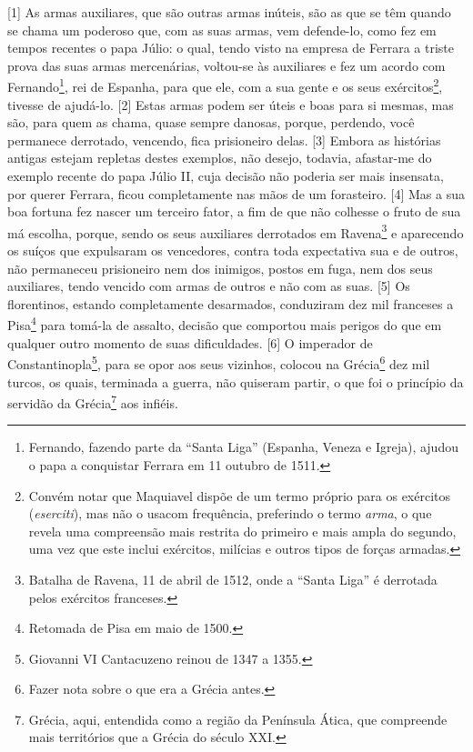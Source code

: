 {[}1{]} As armas auxiliares, que são outras armas inúteis, são as que se
têm quando se chama um poderoso que, com as suas armas, vem defende-lo,
como fez em tempos recentes o papa Júlio: o qual, tendo visto na empresa
de Ferrara a triste prova das suas armas mercenárias, voltou-se às
auxiliares e fez um acordo com Fernando\footnote{Fernando, fazendo parte
  da ``Santa Liga'' (Espanha, Veneza e Igreja), ajudou o papa a
  conquistar Ferrara em 11 outubro de 1511.}, rei de Espanha, para que
ele, com a sua gente e os seus exércitos\footnote{Convém notar que
  Maquiavel dispõe de um termo próprio para os exércitos
  (\emph{eserciti}), mas não o usacom frequência, preferindo o termo
  \emph{arma}, o que revela uma compreensão mais restrita do primeiro e
  mais ampla do segundo, uma vez que este inclui exércitos, milícias e
  outros tipos de forças armadas.}, tivesse de ajudá-lo. {[}2{]} Estas
armas podem ser úteis e boas para si mesmas, mas são, para quem as
chama, quase sempre danosas, porque, perdendo, você permanece derrotado,
vencendo, fica prisioneiro delas. {[}3{]} Embora as histórias antigas
estejam repletas destes exemplos, não desejo, todavia, afastar-me do
exemplo recente do papa Júlio II, cuja decisão não poderia ser mais
insensata, por querer Ferrara, ficou completamente nas mãos de um
forasteiro. {[}4{]} Mas a sua boa fortuna fez nascer um terceiro fator,
a fim de que não colhesse o fruto de sua má escolha, porque, sendo os
seus auxiliares derrotados em Ravena\footnote{Batalha de Ravena, 11 de
  abril de 1512, onde a ``Santa Liga'' é derrotada pelos exércitos
  franceses.} e aparecendo os suíços que expulsaram os vencedores,
contra toda expectativa sua e de outros, não permaneceu prisioneiro nem
dos inimigos, postos em fuga, nem dos seus auxiliares, tendo vencido com
armas de outros e não com as suas. {[}5{]} Os florentinos, estando
completamente desarmados, conduziram dez mil franceses a Pisa\footnote{Retomada
  de Pisa em maio de 1500.} para tomá-la de assalto, decisão que
comportou mais perigos do que em qualquer outro momento de suas
dificuldades. {[}6{]} O imperador de Constantinopla\footnote{Giovanni VI
  Cantacuzeno reinou de 1347 a 1355.}, para se opor aos seus vizinhos,
colocou na Grécia\footnote{Fazer nota sobre o que era a Grécia antes.}
dez mil turcos, os quais, terminada a guerra, não quiseram partir, o que
foi o princípio da servidão da Grécia\footnote{Grécia, aqui, entendida
  como a região da Península Ática, que compreende mais territórios que
  a Grécia do século XXI.} aos infiéis.

